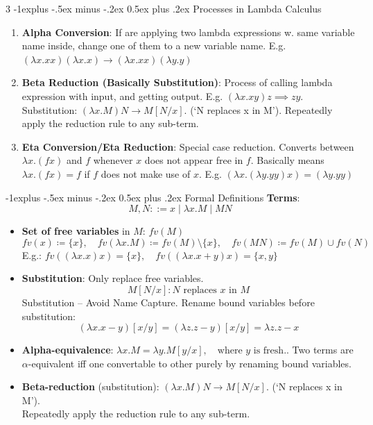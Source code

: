 \documentclass[a4paper, 10pt, landscape]{article}
\makeatletter
\renewcommand{\subsection}{\@startsection{subsection}{2}{0mm}%
                                {-1explus -.5ex minus -.2ex}%
                                {0.5ex plus .2ex}%
                                {\normalfont\normalsize\bfseries}}
\makeatother
\begin{document}
\begin{multicols*}{3}
\subsection{Processes in Lambda Calculus}
\begin{enumerate}
\item \textbf{Alpha Conversion}: If are applying two lambda expressions w. same variable name inside, change one of them to a new variable name. E.g. 
$(\lambda x.xx)(\lambda x.x) \rightarrow  (\lambda x.xx)(\lambda y.y)$
\item \textbf{Beta Reduction (Basically Substitution)}: Process of calling lambda expression with input, and getting output. E.g. $(\lambda x.xy)z \implies zy$.
Substitution: $(\lambda x. M) N \to M[N/x] $. (`N replaces x in M'). Repeatedly apply the reduction rule to any sub-term. 
\item \textbf{Eta Conversion/Eta Reduction}: Special case reduction. Converts between $\lambda x.(f x)$ and $f$ whenever $x$ does not appear free in $f$. Basically means $\lambda x.(f x) = f$ if $f$ does not make use of $x$. E.g. $(\lambda x.(\lambda y.yy)x) = (\lambda y.yy)$
\end{enumerate}


\subsection{Formal Definitions}
\textbf{Terms}:
    \[
    M, N ::= x \mid \lambda x. M \mid M N
    \]
\begin{itemize}
\item \textbf{Set of free variables} in $M$: $fv(M)$
    \[
    fv(x) \coloneqq \{x\}, \quad fv(\lambda x. M) \coloneqq fv(M) \setminus \{x\}, \quad fv(M N) \coloneqq fv(M) \cup fv(N)
    \]
E.g.: $fv((\lambda x. x) x) = \{x\}, \quad fv((\lambda x. x + y) x) = \{x, y\}$

\item \textbf{Substitution}: Only replace free variables.
\[ M[N/x]: N \text{ replaces } x \text{ in } M \]
Substitution – Avoid Name Capture. Rename bound variables before substitution:
        \[
        (\lambda x. x - y)[x/y] = (\lambda z. z - y)[x/y] = \lambda z. z - x
        \]
\item \textbf{Alpha-equivalence}: $\lambda x. M = \lambda y. M[y/x], \quad \text{where } y \text{ is fresh.}$. Two terms are $\alpha$-equivalent iff one convertable to other purely by renaming bound variables.
\item \textbf{Beta-reduction} (substitution): $(\lambda x. M) N \to M[N/x] $. (`N replaces x in M'). \\
Repeatedly apply the reduction rule to any sub-term.
\end{itemize}


\end{multicols*}
\end{document}
